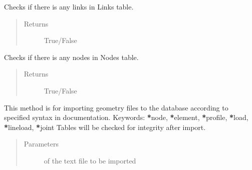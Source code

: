 \documentclass[letterpaper,10pt,english]{sphinxmanual}
\begin{document}
\begin{fulllineitems}
\begin{fulllineitems}
\begin{quote}
\begin{description}
\end{description}\end{quote}

\end{fulllineitems}


\begin{fulllineitems}
\label{\detokenize{api:beamon.database.Database.has_links}}
Checks if there is any links in Links table.
\begin{quote}\begin{description}
\item[{Returns}] \leavevmode
True/False

\end{description}\end{quote}

\end{fulllineitems}


\begin{fulllineitems}
\label{\detokenize{api:beamon.database.Database.has_nodes}}
Checks if there is any nodes in Nodes table.
\begin{quote}\begin{description}
\item[{Returns}] \leavevmode
True/False

\end{description}\end{quote}

\end{fulllineitems}


\begin{fulllineitems}
\label{\detokenize{api:beamon.database.Database.import_text}}
This method is for importing geometry files to the database according to specified syntax in documentation.
Keywords: {\color{red}\bfseries{}*}node, {\color{red}\bfseries{}*}element, {\color{red}\bfseries{}*}profile, {\color{red}\bfseries{}*}load, {\color{red}\bfseries{}*}lineload, {\color{red}\bfseries{}*}joint
Tables will be checked for integrity after import.
\begin{quote}\begin{description}
\item[{Parameters}] \leavevmode
{} \textendash{} of the text file to be imported


\end{description}
\end{quote}
\end{fulllineitems}
\end{fulllineitems}
\end{document}

